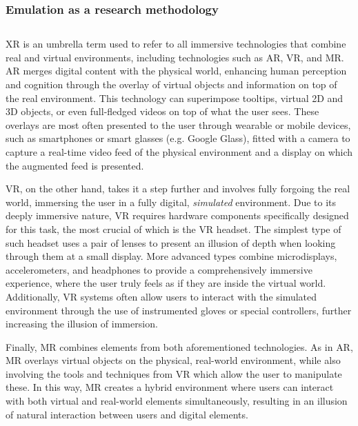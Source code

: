 \subsubsection{Emulation as a research methodology}

\subsection{}\label{background:xr}

\gls{XR} is an umbrella term used to refer to all immersive technologies that combine real and virtual environments, including technologies such as \gls{AR}, \gls{VR}, and \gls{MR}.
\gls{AR} merges digital content with the physical world, enhancing human perception and cognition through the overlay of virtual objects and information on top of the real environment.
This technology can superimpose tooltips, virtual \gls{2D} and \gls{3D} objects, or even full-fledged videos on top of what the user sees.
These overlays are most often presented to the user through wearable or mobile devices, such as smartphones or smart glasses (e.g. Google Glass), fitted with a camera to capture a real-time video feed of the physical environment and a display on which the augmented feed is presented.

\gls{VR}, on the other hand, takes it a step further and involves fully forgoing the real world, immersing the user in a fully digital, \emph{simulated} environment.
Due to its deeply immersive nature, \gls{VR} requires hardware components specifically designed for this task, the most crucial of which is the \gls{VR} headset.
The simplest type of such headset uses a pair of lenses to present an illusion of depth when looking through them at a small display.
More advanced types combine microdisplays, accelerometers, and headphones to provide a comprehensively immersive experience, where the user truly feels as if they are inside the virtual world.
Additionally, \gls{VR} systems often allow users to interact with the simulated environment through the use of instrumented gloves or special controllers, further increasing the illusion of immersion.

Finally, \gls{MR} combines elements from both aforementioned technologies.
As in \gls{AR}, \gls{MR} overlays virtual objects on the physical, real-world environment, while also involving the tools and techniques from \gls{VR} which allow the user to manipulate these.
In this way, \gls{MR} creates a hybrid environment where users can interact with both virtual and real-world elements simultaneously, resulting in an illusion of natural interaction between users and digital elements.

